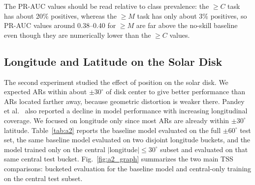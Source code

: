 The PR-AUC values should be read relative to class prevalence: the $\geq C$ task has about 20\% positives, whereas the $\geq M$ task has only about 3\% positives, so PR-AUC values around 0.38--0.40 for $\geq M$ are far above the no-skill baseline even though they are numerically lower than the $\geq C$ values.

\subsection{Longitude and Latitude on the Solar Disk}

The second experiment studied the effect of position on the solar disk. We expected ARs within about $\pm 30^\circ$ of disk center to give better performance than ARs located farther away, because geometric distortion is weaker there. Pandey et al.~\cite{ref_long} also reported a decline in model performance with increasing longitudinal coverage. We focused on longitude only since most ARs are already within $\pm30^\circ$ latitude. Table~\ref{tab:a2} reports the baseline model evaluated on the full $\pm60^\circ$ test set, the same baseline model evaluated on two disjoint longitude buckets, and the model trained only on the central $|$longitude$| \leq 30^\circ$ subset and evaluated on that same central test bucket. Fig.~\ref{fig:a2_graph} summarizes the two main TSS comparisons: bucketed evaluation for the baseline model and central-only training on the central test subset.

